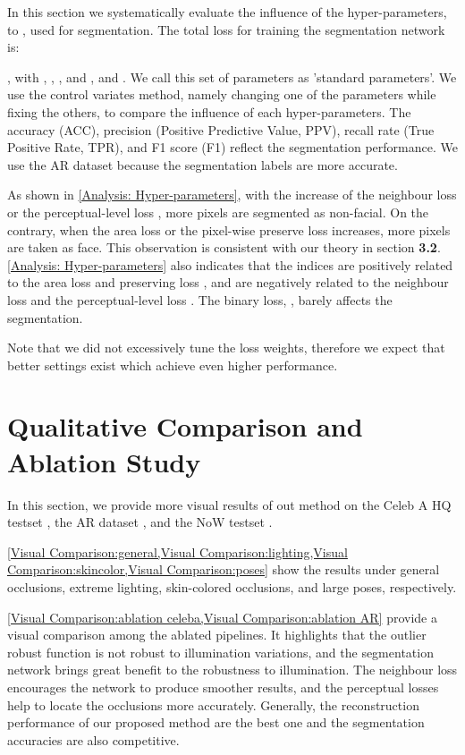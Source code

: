 \documentclass[10pt,twocolumn,letterpaper]{article}
\begin{document}
 In this section we systematically evaluate the influence of the hyper-parameters,  to , used for segmentation. The total loss for training the segmentation network is:

, with , , , and , and . We call this set of parameters as 'standard parameters'. We use the control variates method, namely changing one of the parameters while fixing the others, to compare the influence of each hyper-parameters. The accuracy (ACC), precision (Positive Predictive Value, PPV), recall rate (True Positive Rate, TPR), and F1 score (F1) reflect the segmentation performance. We use the AR dataset \cite{ARdataset} because the segmentation labels are more accurate.

As shown in \cref{Analysis: Hyper-parameters}, with the increase of the neighbour loss  or the perceptual-level loss , more pixels are segmented as non-facial. On the contrary, when the area loss  or the pixel-wise preserve loss  increases, more pixels are taken as face. This observation is consistent with our theory in section \textbf{3.2}. \cref{Analysis: Hyper-parameters} also indicates that the indices are positively related to the area loss  and preserving loss , and are negatively related to the neighbour loss  and the perceptual-level loss . The binary loss, , barely affects the segmentation.

Note that we did not excessively tune the loss weights, therefore we expect that better settings exist which achieve even higher performance.


 \section{Qualitative Comparison and Ablation Study}
In this section, we provide more visual results of out method on the Celeb A HQ testset \cite{CELEBAHQ}, the AR dataset \cite{ARdataset}, and the NoW testset \cite{RingNet:CVPR:2019}. 


\cref{Visual Comparison:general,Visual Comparison:lighting,Visual Comparison:skincolor,Visual Comparison:poses} show the results under general occlusions, extreme lighting, skin-colored occlusions, and large poses, respectively. 

\cref{Visual Comparison:ablation celeba,Visual Comparison:ablation AR} provide a visual comparison among the ablated pipelines. It highlights that the outlier robust function is not robust to illumination variations, and the segmentation network brings great benefit to the robustness to illumination. The neighbour loss encourages the network to produce smoother results, and the perceptual losses help to locate the occlusions more accurately. Generally, the reconstruction performance of our proposed method are the best one and the segmentation accuracies are also competitive.
\end{document}

